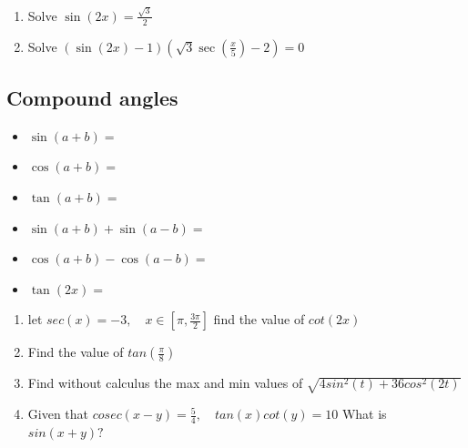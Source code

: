 \documentclass[12pt]{article}
\begin{document}
\begin{enumerate}
    \item Solve $\sin(2x) = \frac{\sqrt{3}}{2}$
    \item Solve $(\sin(2x) - 1)(\sqrt{3}\sec(\frac{x}{5}) - 2) = 0$
\end{enumerate}

\subsection{Compound angles}
\begin{itemize}
    \item $\sin(a+b) = $
    \item $\cos(a+b) = $
    \item $\tan(a+b) = $
    \item $\sin(a + b) + \sin(a - b) = $
    \item $\cos(a + b) - \cos(a - b) = $
    \item $\tan(2x) = $
\end{itemize}
\begin{enumerate}
    \item let $sec(x) = -3, \quad x \in [\pi ,\frac{3\pi}{2}]$ find the value of $cot(2x)$
    \vspace{4cm}

    \item Find the value of $tan(\frac{\pi}{8})$
    \vspace{4cm}

    \item Find without calculus the max and min values of $\sqrt{4sin^{2}(t) + 36cos^{2}(2t)}$
    \vspace{4cm}
    
    \item Given that $cosec(x - y) = \frac{5}{4},\quad tan(x)cot(y) = 10$ What is $sin(x+y)?$
    \vspace{3cm}

\end{enumerate}
\end{document}
